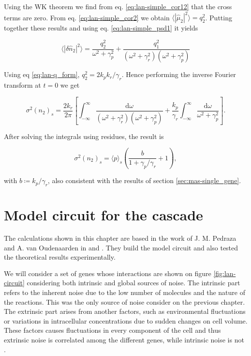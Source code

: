 Using the WK theorem we find from eq. \eqref{eq:lan-simple_cor12} that the cross terms are zero. From eq. \eqref{eq:lan-simple_cor2} we obtain $\langle|\hat{\mu}_2|^2\rangle = q_2^2$. Putting together these results and using eq. \eqref{eq:lan-simple_psd1} it yields

\begin{equation*}
  \langle|\delta\hat{n}_2|^2\rangle = \frac{q_2^2}{\omega^2+\gamma_p^2}+\frac{q_1^2}{(\omega^2+\gamma_r^2)(\omega^2+\gamma_p^2)}
\end{equation*}

Using eq \eqref{eq:lan-q_form}, $q_2^2 = 2k_pk_r/\gamma_r$. Hence performing the inverse Fourier transform at $t=0$ we get

\begin{equation*}
  \sigma^2(n_2)_s = \frac{2k_r}{2\pi}\left[\int_{-\infty}^\infty\frac{\mathrm{d}\omega}{(\omega^2+\gamma_r^2)(\omega^2+\gamma_p^2)} + \frac{k_p}{\gamma_r}\int_{-\infty}^\infty \frac{\mathrm{d}\omega}{\omega^2+\gamma_p^2} \right].
\end{equation*}

After solving the integrals using residues, the result is

\begin{equation}
  \label{eq:lan-simple_varp}
  \sigma^2(n_2)_s = \langle p\rangle_s\left(\frac{b}{1+\gamma_p/\gamma_r}+1\right),
\end{equation}

with $b\coloneqq k_p/\gamma_r$, also consistent with the results of section \ref{sec:mas-single_gene}.

\section{Model circuit for the cascade}
The calculations shown in this chapter are based in the work of J. M. Pedraza and A. van Oudenaarden in \cite{pedraza05} and \cite{pedraza06}. They build the model circuit and also tested the theoretical results experimentally. 

We will consider a set of genes whose interactions are shown on figure \ref{fig:lan-circuit} considering both intrinsic and global sources of noise. The intrinsic part refers to the inherent noise due to the low number of molecules and the nature of the reactions. This was the only source of noise consider on the previous chapter. The extrinsic part arises from another factors, such as environmental fluctuations or variations in intracellular concentrations due to sudden changes on cell volume. These factors causes fluctuations in every component of the cell and thus extrinsic noise is correlated among the different genes, while intrinsic noise is not \cite{elowitz02}.

